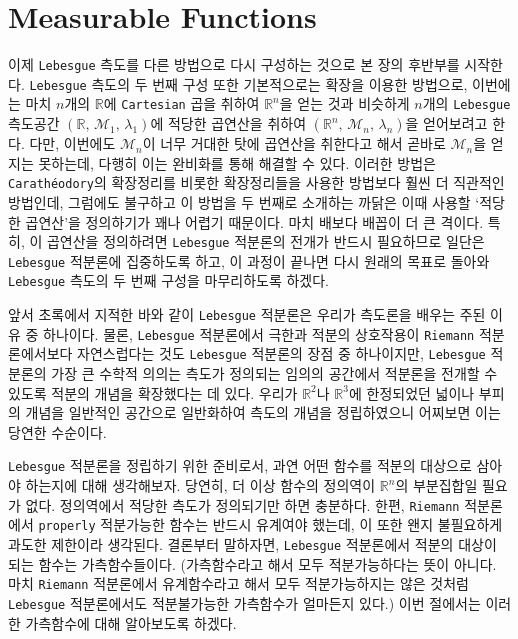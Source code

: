 \section{Measurable Functions}

이제 \texttt{Lebesgue} 측도를 다른 방법으로 다시 구성하는 것으로 본 장의 후반부를 시작한다. \texttt{Lebesgue} 측도의 두 번째 구성 또한 기본적으로는 확장을 이용한 방법으로, 이번에는 마치 $n$개의 $\mathbb{R}$에 \texttt{Cartesian} 곱을 취하여 $\mathbb{R}^n$을 얻는 것과 비슷하게 $n$개의 \texttt{Lebesgue} 측도공간 $(\mathbb{R},\,\mathcal{M}_1,\,\lambda_1)$에 적당한 곱연산을 취하여 $(\mathbb{R}^n,\,\mathcal{M}_n,\,\lambda_n)$을 얻어보려고 한다. 다만, 이번에도 $\mathcal{M}_n$이 너무 거대한 탓에 곱연산을 취한다고 해서 곧바로 $\mathcal{M}_n$을 얻지는 못하는데, 다행히 이는 완비화를 통해 해결할 수 있다. 이러한 방법은 \texttt{Carath\'eodory}의 확장정리를 비롯한 확장정리들을 사용한 방법보다 훨씬 더 직관적인 방법인데, 그럼에도 불구하고 이 방법을 두 번째로 소개하는 까닭은 이때 사용할 `적당한 곱연산'을 정의하기가 꽤나 어렵기 때문이다. 마치 배보다 배꼽이 더 큰 격이다. 특히, 이 곱연산을 정의하려면 \texttt{Lebesgue} 적분론의 전개가 반드시 필요하므로 일단은 \texttt{Lebesgue} 적분론에 집중하도록 하고, 이 과정이 끝나면 다시 원래의 목표로 돌아와 \texttt{Lebesgue} 측도의 두 번째 구성을 마무리하도록 하겠다.

앞서 초록에서 지적한 바와 같이 \texttt{Lebesgue} 적분론은 우리가 측도론을 배우는 주된 이유 중 하나이다. 물론, \texttt{Lebesgue} 적분론에서 극한과 적분의 상호작용이 \texttt{Riemann} 적분론에서보다 자연스럽다는 것도 \texttt{Lebesgue} 적분론의 장점 중 하나이지만, \texttt{Lebesgue} 적분론의 가장 큰 수학적 의의는 측도가 정의되는 임의의 공간에서 적분론을 전개할 수 있도록 적분의 개념을 확장했다는 데 있다. 우리가 $\mathbb{R}^2$나 $\mathbb{R}^3$에 한정되었던 넓이나 부피의 개념을 일반적인 공간으로 일반화하여 측도의 개념을 정립하였으니 어찌보면 이는 당연한 수순이다.

\texttt{Lebesgue} 적분론을 정립하기 위한 준비로서, 과연 어떤 함수를 적분의 대상으로 삼아야 하는지에 대해 생각해보자. 당연히, 더 이상 함수의 정의역이 $\mathbb{R}^n$의 부분집합일 필요가 없다. 정의역에서 적당한 측도가 정의되기만 하면 충분하다. 한편, \texttt{Riemann} 적분론에서 \texttt{properly} 적분가능한 함수는 반드시 유계여야 했는데, 이 또한 왠지 불필요하게 과도한 제한이라 생각된다. 결론부터 말하자면, \texttt{Lebesgue} 적분론에서 적분의 대상이 되는 함수는 가측함수들이다. (가측함수라고 해서 모두 적분가능하다는 뜻이 아니다. 마치 \texttt{Riemann} 적분론에서 유계함수라고 해서 모두 적분가능하지는 않은 것처럼 \texttt{Lebesgue} 적분론에서도 적분불가능한 가측함수가 얼마든지 있다.) 이번 절에서는 이러한 가측함수에 대해 알아보도록 하겠다.


